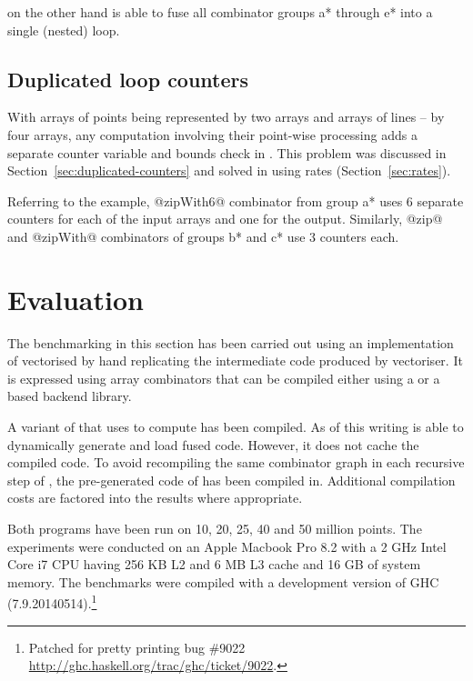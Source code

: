 \documentclass[preamble.tex]{subfiles}
\begin{document}
\LiveFusion on the other hand is able to fuse all combinator groups \*a* through \*e* into a single (nested) loop.


\subsection{Duplicated loop counters}

With arrays of points being represented by two arrays and arrays of lines -- by four arrays, any computation involving their point-wise processing adds a separate counter variable and bounds check in \StreamFusion. This problem was discussed in Section~\ref{sec:duplicated-counters} and solved in \LiveFusion using rates (Section~\ref{sec:rates}).

Referring to the \FilterMax example, @zipWith6@ combinator from group \*a* uses 6 separate counters for each of the input arrays and one for the output. Similarly, @zip@ and @zipWith@ combinators of groups \*b* and \*c* use 3 counters each.



\section{Evaluation}

The benchmarking in this section has been carried out using an implementation of \QuickHull vectorised by hand replicating the intermediate  code produced by \DPH vectoriser. It is expressed using array combinators that can be compiled either using a \StreamFusion or a \LiveFusion based backend library.

A variant of \QuickHull that uses \LiveFusion to compute \FilterMax has been compiled. As of this writing \LiveFusion is able to dynamically generate and load fused code. However, it does not cache the compiled code. To avoid recompiling the same combinator graph in each recursive step of \QuickHull, the pre-generated code of \FilterMax has been compiled in. Additional compilation costs are factored into the results where appropriate.

Both programs have been run on 10, 20, 25, 40 and 50 million points. The experiments were conducted on an Apple Macbook Pro 8.2 with a 2 GHz Intel Core i7 CPU having 256 KB L2 and 6 MB L3 cache and 16 GB of system memory. The benchmarks were compiled with a development version of GHC (7.9.20140514).\footnote{Patched for  pretty printing bug \#9022 \url{http://ghc.haskell.org/trac/ghc/ticket/9022}.}
\end{document}
